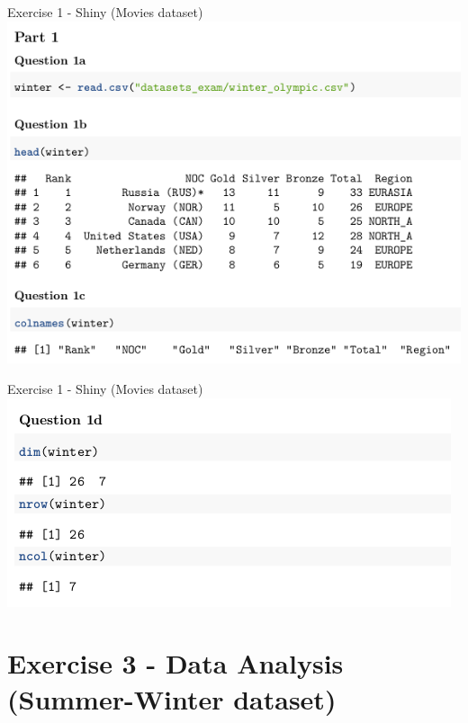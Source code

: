 \documentclass{beamer}
\begin{document}
\begin{frame}{Exercise 1 - Shiny (Movies dataset)}
    \includegraphics[width=\textwidth]{img/ex2_part1_q2.png}
\end{frame}

\begin{frame}{Exercise 1 - Shiny (Movies dataset)}
    \includegraphics[width=\textwidth]{img/ex2_part1_q3.png}
\end{frame}



\section{Exercise 3 - Data Analysis\\(Summer-Winter dataset)}
\end{document}
